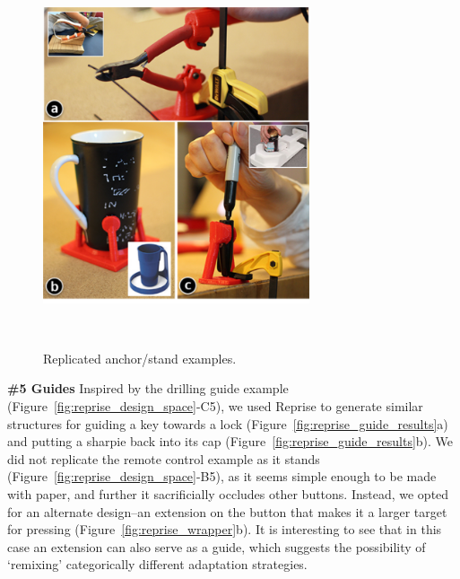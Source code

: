 \begin{figure}[t]
  \centering
  \includegraphics[width=0.7\textwidth]{figures/reprise_anchor_results_v1.pdf}
  \caption{Replicated anchor/stand examples.}~\label{fig:reprise_anchor_results}
\end{figure}

\textbf{\#5 Guides}
Inspired by the drilling guide example (Figure~\ref{fig:reprise_design_space}-C5), we used Reprise to generate similar structures for guiding a key towards a lock (Figure~\ref{fig:reprise_guide_results}a) and putting a sharpie back into its cap (Figure~\ref{fig:reprise_guide_results}b). We did not replicate the remote control example as it stands (Figure~\ref{fig:reprise_design_space}-B5), as it seems simple enough to be made with paper, and further it sacrificially occludes other buttons. Instead, we opted for an alternate design--an extension on the button that makes it a larger target for pressing (Figure~\ref{fig:reprise_wrapper}b). It is interesting to see that in this case an extension can also serve as a guide, which suggests the possibility of `remixing' categorically different adaptation strategies.




